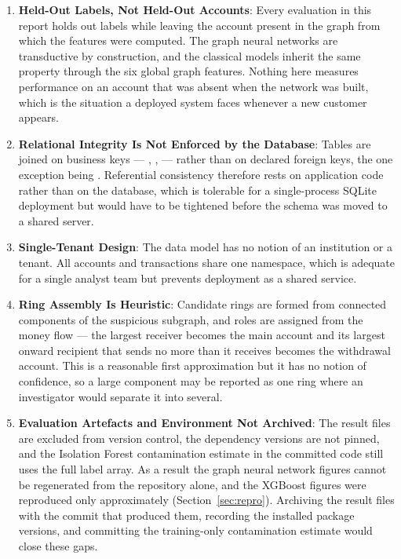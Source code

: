 \begin{enumerate}
  \item \textbf{Held-Out Labels, Not Held-Out Accounts}: Every evaluation in this report holds out labels while leaving the account present in the graph from which the features were computed. The graph neural networks are transductive by construction, and the classical models inherit the same property through the six global graph features. Nothing here measures performance on an account that was absent when the network was built, which is the situation a deployed system faces whenever a new customer appears.
  \item \textbf{Relational Integrity Is Not Enforced by the Database}: Tables are joined on business keys --- , ,  --- rather than on declared foreign keys, the one exception being . Referential consistency therefore rests on application code rather than on the database, which is tolerable for a single-process SQLite deployment but would have to be tightened before the schema was moved to a shared server.
  \item \textbf{Single-Tenant Design}: The data model has no notion of an institution or a tenant. All accounts and transactions share one namespace, which is adequate for a single analyst team but prevents deployment as a shared service.
  \item \textbf{Ring Assembly Is Heuristic}: Candidate rings are formed from connected components of the suspicious subgraph, and roles are assigned from the money flow --- the largest receiver becomes the main account and its largest onward recipient that sends no more than it receives becomes the withdrawal account. This is a reasonable first approximation but it has no notion of confidence, so a large component may be reported as one ring where an investigator would separate it into several.
  \item \textbf{Evaluation Artefacts and Environment Not Archived}: The result files are excluded from version control, the dependency versions are not pinned, and the Isolation Forest contamination estimate in the committed code still uses the full label array. As a result the graph neural network figures cannot be regenerated from the repository alone, and the XGBoost figures were reproduced only approximately (Section~\ref{sec:repro}). Archiving the result files with the commit that produced them, recording the installed package versions, and committing the training-only contamination estimate would close these gaps.
\end{enumerate}
